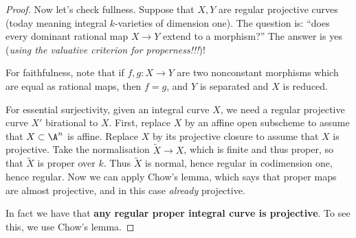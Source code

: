 \documentclass[11pt]{article}
\begin{document}
\begin{Nov8}
\begin{proof}
Now let's check fullness. Suppose that $X,Y$ are regular projective curves (today meaning integral $k$-varieties of dimension one). The question is: ``does every dominant rational map $X\to Y$ extend to a morphism?'' The answer is yes (\emph{using the valuative criterion for properness!!!})!

For faithfulness, note that if $f,g:X\to Y$ are two nonconstant morphisms which are equal as rational maps, then $f=g$, and $Y$ is separated and $X$ is reduced.

For essential surjectivity, given an integral curve $X$, we need a regular projective curve $X'$ birational to $X$. First, replace $X$ by an affine open subscheme to assume that $X\subset\A^n$ is affine. Replace $X$ by its projective closure to assume that $X$ is projective. Take the normalisation $\widetilde{X}\to X$, which is finite and thus proper, so that $\widetilde{X}$ is proper over $k$. Thus $\widetilde{X}$ is normal, hence regular in codimension one, hence regular. Now we can apply Chow's lemma, which says that proper maps are almost projective, and in this case \emph{already} projective.

In fact we have that \textbf{any regular proper integral curve is projective}. To see this, we use Chow's lemma.
\end{proof}

\end{Nov8}
\end{document}
